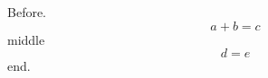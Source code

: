 \documentclass[10pt,leqno]{article}
\begin{document}
Before.
\begin{equation} a + b = c \tag{hi $x^2$} \end{equation}
middle
\begin{equation} d = e \tag*{$\ast$} \end{equation}
end.
\end{document}
